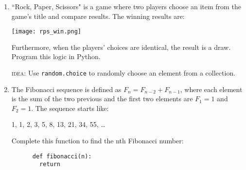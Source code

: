 \documentclass{article}
\begin{document}
  \begin{enumerate}
    \item ``Rock, Paper, Scissors" is a game where two players
      choose an item from the game's title and compare results. 
      The winning results are:

      \begin{center}
        \texttt{[image: rps\_win.png]}
      \end{center}
      Furthermore, when the players' choices are identical, the result is a draw.
      Program this logic in Python.

      \textsc{idea}: Use \texttt{random.choice} to randomly choose an element
      from a collection.

    \item The Fibonacci sequence is defined as $F_n = F_{n-2} + F_{n-1}$, where
    each element is the sum of the two previous and the first two elements are
    $F_1 = 1$ and $F_2 = 1$. The sequence starts like:

    \begin{center}
      1, 1, 2, 3, 5, 8, 13, 21, 34, 55, \ldots
    \end{center}

    Complete this function to find the nth Fibonacci number:
    \begin{verbatim}
      def fibonacci(n):
        return 
    \end{verbatim}
  \end{enumerate}
\end{document}
